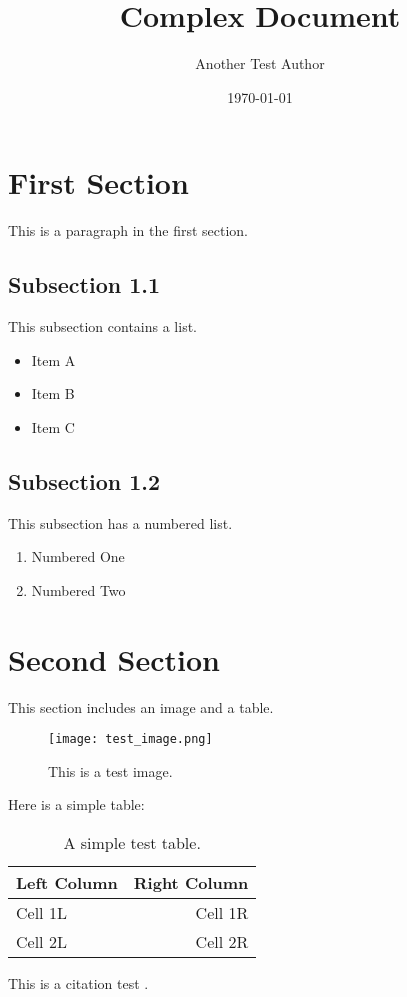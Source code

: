 \documentclass{article}
\title{Complex Document}
\author{Another Test Author}
\date{\today}
\begin{document}
\maketitle

\section{First Section}
This is a paragraph in the first section.

\subsection{Subsection 1.1}
This subsection contains a list.
\begin{itemize}
    \item Item A
    \item Item B
    \item Item C
\end{itemize}

\subsection{Subsection 1.2}
This subsection has a numbered list.
\begin{enumerate}
    \item Numbered One
    \item Numbered Two
\end{enumerate}

\section{Second Section}
This section includes an image and a table.

\begin{figure}[h!]
    \centering
    \texttt{[image: test\_image.png]}
    \caption{This is a test image.}
    \label{fig:test}
\end{figure}

Here is a simple table:
\begin{table}[h!]
    \centering
    \begin{tabular}{|l|r|}
        \hline
        Left Column & Right Column \\
        \hline
        Cell 1L & Cell 1R \\
        Cell 2L & Cell 2R \\
        \hline
    \end{tabular}
    \caption{A simple test table.}
    \label{tab:test}
\end{table}

This is a citation test \citep{test_key}.
\end{document}
